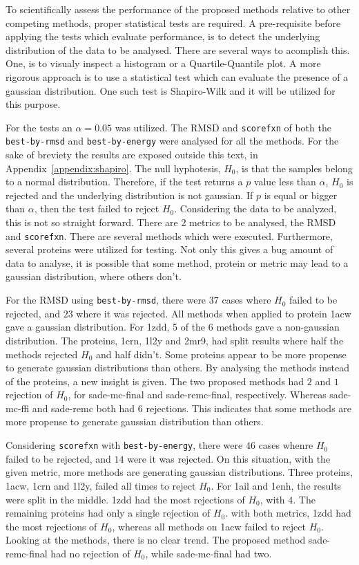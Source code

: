 To scientifically assess the performance of the proposed methods relative to
other competing methods, proper statistical tests are required. A pre-requisite
before applying the tests which evaluate performance, is to detect the
underlying distribution of the data to be analysed. There are several ways to
acomplish this. One, is to visualy inspect a histogram or a Quartile-Quantile
plot. A more rigorous approach is to use a statistical test which can evaluate
the presence of a gaussian distribution. One such test is Shapiro-Wilk and it
will be utilized for this purpose.

For the tests an $\alpha = 0.05$ was utilized. The RMSD and \texttt{scorefxn}
of both the \texttt{best-by-rmsd} and \texttt{best-by-energy} were analysed for
all the methods. For the sake of breviety the results are exposed outside this
text, in Appendix~\ref{appendix:shapiro}. The null hyphotesis, $H_0$, is that
the samples belong to a normal distribution. Therefore, if the test returns a $p$
value less than $\alpha$, $H_0$ is rejected and the underlying distribution is
not gaussian. If $p$ is equal or bigger than $\alpha$, then the test failed to
reject $H_0$. Considering the data to be analyzed, this is not so straight
forward. There are 2 metrics to be analysed, the RMSD and \texttt{scorefxn}.
There are several methods which were executed. Furthermore, several proteins
were utilized for testing. Not only this gives a bug amount of data to analyse,
it is possible that some method, protein or metric may lead to a gaussian
distribution, where others don't.

For the RMSD using \texttt{best-by-rmsd}, there were $37$ cases where $H_0$
failed to be rejected, and $23$ where it was rejected. All methods when applied
to protein 1acw gave a gaussian distribution. For 1zdd, 5 of the 6 methods gave
a non-gaussian distribution. The proteins, 1crn, 1l2y and 2mr9, had split results
where half the methods rejected $H_0$ and half didn't. Some proteins appear to
be more propense to generate gaussian distributions than others. By analysing
the methods instead of the proteins, a new insight is given. The two proposed
methods had $2$ and $1$ rejection of $H_0$, for sade-mc-final and sade-remc-final,
respectively. Whereas sade-mc-ffi and sade-remc both had $6$ rejections. This
indicates that some methods are more propense to generate gaussian distribution
than others.

Considering \texttt{scorefxn} with \texttt{best-by-energy}, there were $46$
cases whenre $H_0$ failed to be rejected, and $14$ were it was rejected. On this
situation, with the given metric, more methods are generating gaussian
distributions. Three proteins, 1acw, 1crn and 1l2y, failed all times to reject $H_0$.
For 1ail and 1enh, the results were split in the middle. 1zdd had the most
rejections of $H_0$, with $4$. The remaining proteins had only a single
rejection of $H_0$. with both metrics, 1zdd had the most rejections of $H_0$,
whereas all methods on 1acw failed to reject $H_0$. Looking at the methods,
there is no clear trend. The proposed method sade-remc-final had no rejection
of $H_0$, while sade-mc-final had two.

